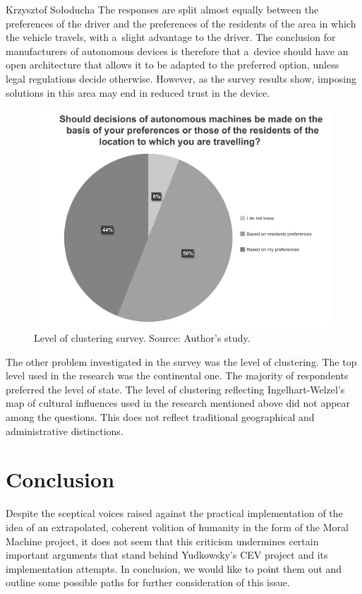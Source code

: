 \begin{artengenv}{Krzysztof Sołoducha}
The responses are split almost equally between the preferences of the driver and the preferences of the residents of the area in which the vehicle travels, with a~slight advantage to the driver. The conclusion for manufacturers of autonomous devices is therefore that a~device should have an open architecture that allows it to be adapted to the preferred option, unless legal regulations decide otherwise. However, as the survey results show, imposing solutions in this area may end in reduced trust in the device.
\begin{figure}
 \begin{center}
 \includegraphics[width=.8\textwidth]{ART_Soloducha/illustration2.pdf}%
 \end{center}%
 \caption{Level of clustering survey. Source: Author's study.}\label{sol-ill2}
\end{figure}

The other problem investigated in the survey was the level of clustering. The top level used in the research was the continental one. The majority of respondents preferred the level of state. The level of clustering reflecting Ingelhart-Welzel's map of cultural influences used in the research mentioned above did not appear among the questions. This does not reflect traditional geographical and administrative distinctions.

\section*{Conclusion}
Despite the sceptical voices raised against the practical implementation of the idea of an extrapolated, coherent volition of humanity in the form of the Moral Machine project, it does not seem that this criticism undermines certain important arguments that stand behind Yudkowsky's CEV project and its implementation attempts. In conclusion, we would like to point them out and outline some possible paths for further consideration of this issue.


\end{artengenv}
